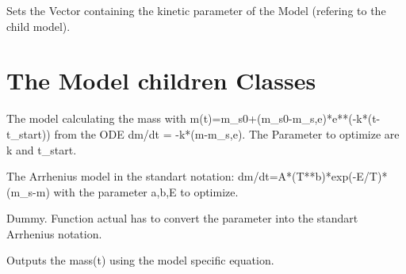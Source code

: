 \documentclass[letterpaper,10pt,english]{sphinxmanual}
\begin{document}
\begin{fulllineitems}
\begin{fulllineitems}
\end{fulllineitems}


\begin{fulllineitems}
\label{FittingClasses:Fit_one_run.Model.setParamVector}
Sets the Vector containing the kinetic parameter of the Model (refering to the child model).

\end{fulllineitems}


\end{fulllineitems}



\section{The Model children Classes}
\label{FittingClasses:the-model-children-classes}

\begin{fulllineitems}
\label{FittingClasses:Fit_one_run.ConstantRateModel}
The model calculating the mass with m(t)=m\_s0+(m\_s0-m\_s,e)*e**(-k*(t-t\_start)) from the ODE dm/dt = -k*(m-m\_s,e). The Parameter to optimize are k and t\_start.

\end{fulllineitems}


\begin{fulllineitems}
\label{FittingClasses:Fit_one_run.ArrheniusModel}
The Arrhenius model in the standart notation: dm/dt=A*(T**b)*exp(-E/T)*(m\_s-m) with the parameter a,b,E to optimize.

\begin{fulllineitems}
\label{FittingClasses:Fit_one_run.ArrheniusModel.ConvertKinFactors}
Dummy. Function actual has to convert the parameter into the standart Arrhenius notation.

\end{fulllineitems}


\begin{fulllineitems}
\label{FittingClasses:Fit_one_run.ArrheniusModel.calcMass}
Outputs the mass(t) using the model specific equation.

\end{fulllineitems}


\end{fulllineitems}
\end{document}
